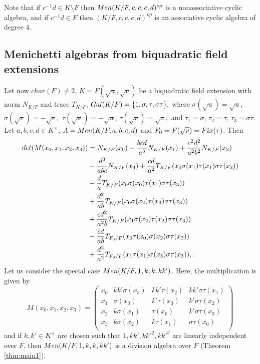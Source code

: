 \documentclass[11pt]{amsart}
\theoremstyle{plain}
\theoremstyle{definition}
\begin{document}
 Note that if $c^{-1}d \in K \setminus F$ then ${\rm Men}(K/F, c,c,c,d)^{op}$
 is a nonassociative cyclic algebra,  and if $c^{-1}d \in F$ then $(K/F, c,c,c,d)^{op}$ is an associative cyclic algebra of degree $4$.



\subsection{Menichetti algebras from biquadratic field extensions}

  Let now  $char(F)\not=2$, $K = F(\sqrt{u}, \sqrt{v})$ be a biquadratic field extension with norm $N_{K/F}$ and trace $T_{K/F}$,
${\rm Gal}(K/F) = \{1, \sigma, \tau, \sigma \tau\},$ where
$\sigma(\sqrt{u}) = \sqrt{u},$ $\sigma(\sqrt{v}) = -\sqrt{v},$
$\tau(\sqrt{u}) = -\sqrt{u}$, $\tau(\sqrt{v}) = \sqrt{v},$ and $\tau_1=\sigma$, $\tau_2=\tau$, $\tau_3=\sigma\tau$.
Let $a,b,c,d \in K^\times$, $A={\rm Men}(K/F, a,b,c,d) $ and $F_0 = F(\sqrt{v})={\rm Fix}(\tau)$.
Then
\begin{align} \label{ExplicitDet2}
{\rm det}(M(x_0, x_1, x_2, x_3)) & = N_{K/F}(x_0) - \frac{bcd}{a^3}N_{K/F}(x_1) + \frac{c^2d^2}{a^2b^2}N_{K/F}(x_2) \notag \\
& - \frac{d^3}{abc}N_{K/F}(x_3) + \frac{cd}{a^2}T_{K/F}(x_0 \sigma(x_1)\tau(x_1) \sigma\tau(x_2)) \notag \\
& - \frac{d}{a}T_{K/F}(x_0 \sigma(x_0) \tau(x_1) \sigma\tau(x_3))\notag \\
& + \frac{d^2}{ab}T_{K/F}(x_0 \sigma(x_2)\tau(x_3) \sigma\tau(x_3)) \\
& + \frac{cd^2}{a^2b}T_{K/F}(x_1 \sigma(x_2) \tau(x_2) \sigma\tau(x_3)) \notag \\
& - \frac{cd}{ab}T_{F_0/F}(x_0\tau(x_0) \sigma(x_2)  \sigma\tau(x_2))\notag \\
& + \frac{d^2}{a^2}T_{F_0/F}(x_1\tau(x_1)\sigma(x_3)\sigma\tau(x_3)), \notag .
\end{align}
Let us consider the special case  ${\rm Men}(K/F,1,k,k,kk')$. Here, the multiplication is given by
\[M(x_0, x_1, x_2, x_3)=
\left( \begin{array}{cccc}
x_0 &  kk'\sigma(x_{3}) & kk'\tau(x_{2}) & kk' \sigma \tau(x_{1})\\
x_1 & \sigma(x_0)       & k' \tau(x_{3})  &  k' \sigma \tau(x_{2})\\
x_2 & k\sigma(x_{1})    & \tau(x_0)       & k' \sigma \tau(x_{3})\\
x_3 &  k\sigma(x_{2})   &  k\tau(x_1)      &  \sigma \tau(x_{0}) \\
\end {array}\right)
 \]
 and if $k,k'\in K^\times$ are chosen such that $1,kk', kk'^2, kk'^3$  are linearly independent over $F$, then
${\rm Men}(K/F,1,k,k,kk')$ is a division algebra over $F$ (Theorem \ref{thm:main1}).
\end{document}
